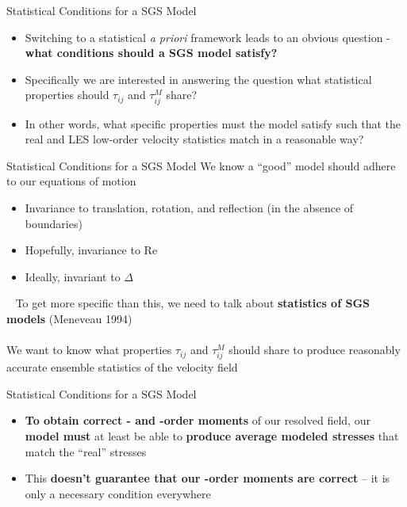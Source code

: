 \begin{frame}{Statistical Conditions for a SGS Model}
\begin{itemize}
	\item Switching to a statistical \textit{a priori} framework leads to an obvious question - \textbf{what conditions should a SGS model satisfy?}
	\item Specifically we are interested in answering the question what statistical properties should $\tau_{ij}$ and $\tau_{ij}^{M}$ share?
	\item In other words, what specific properties must the model satisfy such that the real and LES low-order velocity statistics match in a reasonable way?  
\end{itemize}
\end{frame}
\begin{frame}{Statistical Conditions for a SGS Model}
We know a ``good'' model should adhere to our equations of motion
\begin{itemize}
	\item Invariance to translation, rotation, and reflection (in the absence of boundaries)
	\item Hopefully, invariance to Re
	\item Ideally, invariant to $\Delta$
\end{itemize}
~\newline
To get more specific than this, we need to talk about \textbf{statistics of SGS models} (Meneveau 1994)\\~\\
We want to know what properties $\tau_{ij}$ and $\tau_{ij}^{M}$ should share to produce reasonably accurate ensemble statistics of the velocity field
\end{frame}
\begin{frame}{Statistical Conditions for a SGS Model}
\begin{itemize}
	\item \textbf{To obtain correct - and -order moments} of our resolved field, our \textbf{model must} at least be able to \textbf{produce average modeled stresses} that match the ``real'' stresses
	\item This \textbf{doesn't guarantee that our -order moments are correct} -- it is only a necessary condition everywhere
\end{itemize}
\end{frame}
